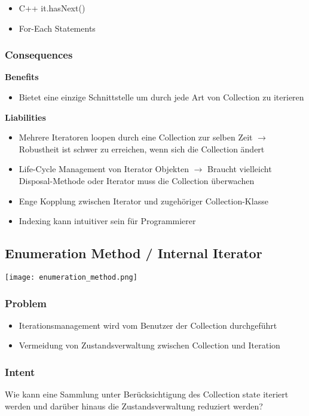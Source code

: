 \begin{itemize}
    \item C++ it.hasNext()
    \item For-Each Statements
\end{itemize}

\subsubsection{Consequences}
\textbf{Benefits}
\begin{itemize}
    \item Bietet eine einzige Schnittstelle um durch jede Art von Collection zu iterieren
\end{itemize}
\vspace{10pt}
\textbf{Liabilities}
\begin{itemize}
    \item Mehrere Iteratoren loopen durch eine Collection zur selben Zeit $\rightarrow$ Robustheit ist schwer zu erreichen, wenn sich die Collection ändert
    \item Life-Cycle Management von Iterator Objekten $\rightarrow$ Braucht vielleicht Disposal-Methode oder Iterator muss die Collection überwachen
    \item Enge Kopplung zwischen Iterator und zugehöriger Collection-Klasse
    \item Indexing kann intuitiver sein für Programmierer
\end{itemize}

\vfill\null
\columnbreak

\subsection{Enumeration Method / Internal Iterator}

\texttt{[image: enumeration\_method.png]}

\subsubsection{Problem}
\begin{itemize}
    \item Iterationsmanagement wird vom Benutzer der Collection durchgeführt
    \item Vermeidung von Zustandsverwaltung zwischen Collection und Iteration
\end{itemize}

\subsubsection{Intent}
Wie kann eine Sammlung unter Berücksichtigung des Collection state iteriert werden und darüber hinaus die Zustandsverwaltung reduziert werden?

